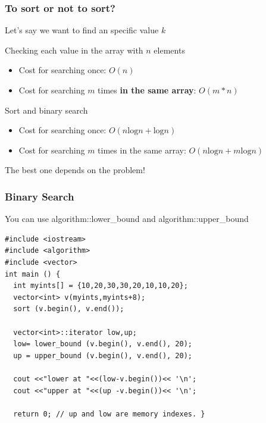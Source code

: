 \documentclass{beamer}
\begin{document}
\begin{frame}
  \frametitle{To sort or not to sort?}

  Let's say we want to find an specific value $k$

  \bigskip
  
  \begin{block}{Checking each value in the array with $n$ elements}
    \begin{itemize}
    \item Cost for searching once: $O(n)$
    \item Cost for searching $m$ times {\bf in the same array}: $O(m*n)$
    \end{itemize}
  \end{block}

  \begin{alertblock}{Sort and binary search}
    \begin{itemize}
    \item Cost for searching once: $O(n\text{log}n + \text{log}n)$
    \item Cost for searching $m$ times in the same array: $O(n\text{log}n + m\text{log}n)$
    \end{itemize}
  \end{alertblock}
  
  \bigskip

  The best one depends on the problem!
\end{frame}

\begin{frame}[fragile]
  \frametitle{Binary Search}
  
  {\small You can use algorithm::lower\_bound and algorithm::upper\_bound
   
  \begin{block}{}
\begin{verbatim} 
#include <iostream>     
#include <algorithm>    
#include <vector>       
int main () {
  int myints[] = {10,20,30,30,20,10,10,20};
  vector<int> v(myints,myints+8);           
  sort (v.begin(), v.end());                

  vector<int>::iterator low,up;
  low= lower_bound (v.begin(), v.end(), 20); 
  up = upper_bound (v.begin(), v.end(), 20); 

  cout <<"lower at "<<(low-v.begin())<< '\n';
  cout <<"upper at "<<(up -v.begin())<< '\n';

  return 0; // up and low are memory indexes. }
\end{verbatim}
    \end{block}
}
\end{frame}
\end{document}
